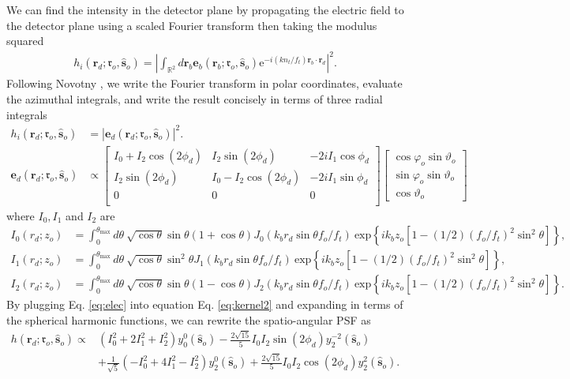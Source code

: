 \documentclass[11pt]{article}
\newcommand{\me}{\mathrm{e}}
\providecommand{\mb}[1]{\mathbf{#1}}
\providecommand{\ro}[1]{\mathbf{\mathfrak{r}}_o}
\providecommand{\so}[1]{\mathbf{\hat{s}}_o}
\providecommand{\rb}[1]{\mathbf{r}_b}
\providecommand{\rd}[1]{\mathbf{r}_d}
\begin{document}
We can find the intensity in the detector plane by propagating the electric
field to the detector plane using a scaled Fourier transform then taking the
modulus squared
\begin{align}
  h_i(\rd{}; \ro{}, \so{}) = \left|\int_{\mathbb{R}^2} d\rb{} \mb{e}_b(\rb{}; \ro{}, \so{})\me^{-i (kn_t/f_t) \rb{} \cdot \rd{}}\right|^2 \label{eq:kernel}.
\end{align}
Following Novotny \cite{nov2006}, we write the Fourier transform in polar
coordinates, evaluate the azimuthal integrals, and write the result concisely in
terms of three radial integrals
\begin{align}
    h_i(\rd{}; \ro{}, \so{}) &= \left|\mb{e}_d(\rd{}; \ro{}, \so{})\right|^2 \label{eq:kernel2}.\\
  \mb{e}_d(\rd{}; \ro{}, \so{}) &\propto
  \begin{bmatrix}
    I_0 + I_2\cos(2\phi_d) & I_2\sin(2\phi_d) & -2iI_1\cos\phi_d\\
    I_2\sin(2\phi_d) & I_0 - I_2\cos(2\phi_d) & -2iI_1\sin\phi_d\\
    0&0&0\\
  \end{bmatrix}
  \begin{bmatrix}
    \cos\varphi_o\sin\vartheta_o\\
    \sin\varphi_o\sin\vartheta_o\\
    \cos\vartheta_o
  \end{bmatrix}\label{eq:elec}
\end{align}
where $I_0, I_1$ and $I_2$ are
\begin{align}
  I_0(r_d; z_o) &= \int_0^{\theta_{\text{max}}}d\theta\ \sqrt{\cos\theta}\sin\theta(1+\cos\theta)J_0(k_b r_d\sin\theta f_o/f_t)\ \text{exp}\left\{ik_bz_o[1-(1/2)(f_o/f_t)^2\sin^2\theta]\right\},\\
  I_1(r_d; z_o) &= \int_0^{\theta_{\text{max}}}d\theta\ \sqrt{\cos\theta}\sin^2\theta J_1(k_b r_d\sin\theta f_o/f_t)\ \text{exp}\left\{ik_bz_o[1-(1/2)(f_o/f_t)^2\sin^2\theta]\right\},\\
  I_2(r_d; z_o) &= \int_0^{\theta_{\text{max}}}d\theta\ \sqrt{\cos\theta}\sin\theta(1-\cos\theta)J_2(k_b r_d\sin\theta f_o/f_t)\ \text{exp}\left\{ik_bz_o[1-(1/2)(f_o/f_t)^2\sin^2\theta]\right\}.
\end{align}
By plugging Eq. \ref{eq:elec} into equation Eq. \ref{eq:kernel2} and expanding in
terms of the spherical harmonic functions, we can rewrite the spatio-angular
PSF as
\begin{equation}
  \begin{split}
  h(\rd{}; \ro{}, \so{}) \propto &\left(I_0^2 + 2I_1^2 + I_2^2\right)y_0^0(\so{}) -\frac{2\sqrt{15}}{5}I_0I_2\sin(2\phi_d)y_2^{-2}(\so{})\\ &+ \frac{1}{\sqrt{5}}\left(-I_0^2 + 4I_1^2 - I_2^2\right)y_2^{0}(\so{}) +\frac{2\sqrt{15}}{5}I_0I_2\cos(2\phi_d)y_2^{2}(\so{}). \label{eq:kerna}
\end{split}
\end{equation}
\end{document}
